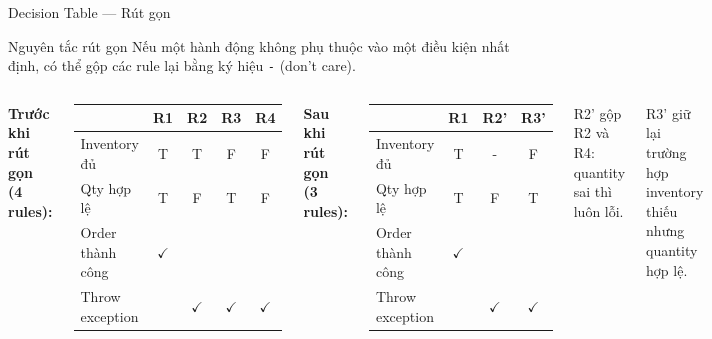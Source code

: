 \documentclass[aspectratio=169,12pt]{beamer}
\begin{document}
\begin{frame}[shrink=8]{Decision Table --- Rút gọn}
  \begin{block}{Nguyên tắc rút gọn}
    Nếu một hành động không phụ thuộc vào một điều kiện nhất định,
    có thể gộp các rule lại bằng ký hiệu \texttt{-} (don't care).
  \end{block}

  \vspace{0.2em}
  \begin{columns}[T,totalwidth=\textwidth]
    \textbf{Trước khi rút gọn (4 rules):}
    \begin{center}
    \scriptsize
    \setlength{\tabcolsep}{3pt}
    \begin{tabular}{lcccc}
      \toprule
      & R1 & R2 & R3 & R4 \\
      \midrule
      Inventory đủ & T & T & F & F \\
      Qty hợp lệ   & T & F & T & F \\
      \midrule
      Order thành công & $\checkmark$ & & & \\
      Throw exception  & & $\checkmark$ & $\checkmark$ & $\checkmark$ \\
      \bottomrule
    \end{tabular}
    \end{center}

    \textbf{Sau khi rút gọn (3 rules):}
    \begin{center}
    \scriptsize
    \setlength{\tabcolsep}{3pt}
    \begin{tabular}{lccc}
      \toprule
      & R1 & R2' & R3' \\
      \midrule
      Inventory đủ & T & - & F \\
      Qty hợp lệ   & T & F & T \\
      \midrule
      Order thành công & $\checkmark$ & & \\
      Throw exception  & & $\checkmark$ & $\checkmark$ \\
      \bottomrule
    \end{tabular}
    \end{center}

    \vspace{0.15em}
    {\scriptsize R2' gộp R2 và R4: quantity sai thì luôn lỗi.\par
    R3' giữ lại trường hợp inventory thiếu nhưng quantity hợp lệ.}
  \end{columns}
\end{frame}
\end{document}

